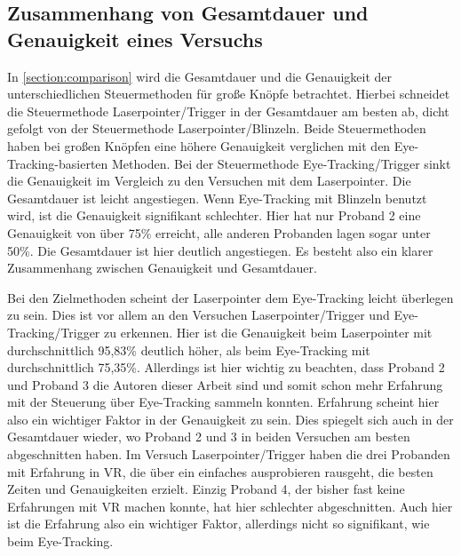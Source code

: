 \subsection{Zusammenhang von Gesamtdauer und Genauigkeit eines Versuchs}
In \autoref{section:comparison} wird die Gesamtdauer und die Genauigkeit der unterschiedlichen Steuermethoden für große Knöpfe betrachtet. Hierbei schneidet die Steuermethode Laserpointer/Trigger in der Gesamtdauer am besten ab, dicht gefolgt von der Steuermethode Laserpointer/Blinzeln. Beide Steuermethoden haben bei großen Knöpfen eine höhere Genauigkeit verglichen mit den Eye-Tracking-basierten Methoden. Bei der Steuermethode Eye-Tracking/Trigger sinkt die Genauigkeit im Vergleich zu den Versuchen mit dem Laserpointer. Die Gesamtdauer ist leicht angestiegen. Wenn Eye-Tracking mit Blinzeln benutzt wird, ist die Genauigkeit signifikant schlechter. Hier hat nur Proband 2 eine Genauigkeit von über 75\% erreicht, alle anderen Probanden lagen sogar unter 50\%. Die Gesamtdauer ist hier deutlich angestiegen. Es besteht also ein klarer Zusammenhang zwischen Genauigkeit und Gesamtdauer. 

Bei den Zielmethoden scheint der Laserpointer dem Eye-Tracking leicht überlegen zu sein. Dies ist vor allem an den Versuchen Laserpointer/Trigger und Eye-Tracking/Trigger zu erkennen. Hier ist die Genauigkeit beim Laserpointer mit durchschnittlich 95,83\% deutlich höher, als beim Eye-Tracking mit durchschnittlich 75,35\%. Allerdings ist hier wichtig zu beachten, dass Proband 2 und Proband 3 die Autoren dieser Arbeit sind und somit schon mehr Erfahrung mit der Steuerung über Eye-Tracking sammeln konnten. Erfahrung scheint hier also ein wichtiger Faktor in der Genauigkeit zu sein. Dies spiegelt sich auch in der Gesamtdauer wieder, wo Proband 2 und 3 in beiden Versuchen am besten abgeschnitten haben. Im Versuch Laserpointer/Trigger haben die drei Probanden mit Erfahrung in \ac{VR}, die über ein einfaches ausprobieren rausgeht, die besten Zeiten und Genauigkeiten erzielt. Einzig Proband 4, der bisher fast keine Erfahrungen mit \ac{VR} machen konnte, hat hier schlechter abgeschnitten. Auch hier ist die Erfahrung also ein wichtiger Faktor, allerdings nicht so signifikant, wie beim Eye-Tracking. 

